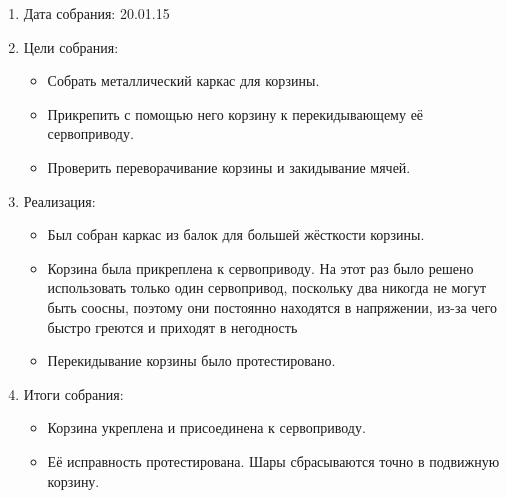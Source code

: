 \begin{enumerate}
  	
  \item Дата собрания: 20.01.15
	
  \item Цели собрания: 
  \begin{itemize}
    \item Собрать металлический каркас для корзины.
		
	\item Прикрепить с помощью него корзину к перекидывающему её сервоприводу.
	
	\item Проверить переворачивание корзины и закидывание мячей.
  \end{itemize}

  \item Реализация:
  \begin{itemize}
    \item Был собран каркас из балок для большей жёсткости корзины.
	
	\item Корзина была прикреплена к сервоприводу. На этот раз было решено использовать только один сервопривод, поскольку два никогда не могут быть соосны, поэтому они постоянно находятся в  напряжении, из-за чего быстро греются и приходят в негодность
    
    \item Перекидывание корзины было протестировано.
  
  \end{itemize}
	
  \item Итоги собрания:
  \begin{itemize}
	\item Корзина укреплена и присоединена к сервоприводу.
    
    \item Её исправность протестирована. Шары сбрасываются точно в подвижную корзину.
	
  \end{itemize}
	
\end{enumerate}
\fillpage